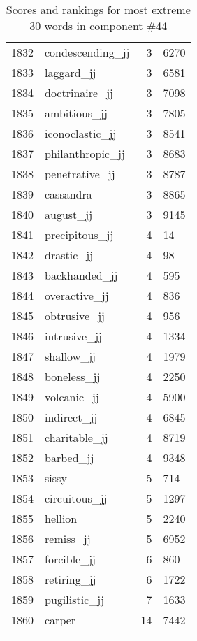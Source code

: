 \begin{longtable}[!htbp]{| rlr@{.}l |}
    1832 & condescending\_jj & 3 & 6270 \\
    1833 & laggard\_jj & 3 & 6581 \\
    1834 & doctrinaire\_jj & 3 & 7098 \\
    1835 & ambitious\_jj & 3 & 7805 \\
    1836 & iconoclastic\_jj & 3 & 8541 \\
    1837 & philanthropic\_jj & 3 & 8683 \\
    1838 & penetrative\_jj & 3 & 8787 \\
    1839 & cassandra & 3 & 8865 \\
    1840 & august\_jj & 3 & 9145 \\
    1841 & precipitous\_jj & 4 & 14 \\
    1842 & drastic\_jj & 4 & 98 \\
    1843 & backhanded\_jj & 4 & 595 \\
    1844 & overactive\_jj & 4 & 836 \\
    1845 & obtrusive\_jj & 4 & 956 \\
    1846 & intrusive\_jj & 4 & 1334 \\
    1847 & shallow\_jj & 4 & 1979 \\
    1848 & boneless\_jj & 4 & 2250 \\
    1849 & volcanic\_jj & 4 & 5900 \\
    1850 & indirect\_jj & 4 & 6845 \\
    1851 & charitable\_jj & 4 & 8719 \\
    1852 & barbed\_jj & 4 & 9348 \\
    1853 & sissy & 5 & 714 \\
    1854 & circuitous\_jj & 5 & 1297 \\
    1855 & hellion & 5 & 2240 \\
    1856 & remiss\_jj & 5 & 6952 \\
    1857 & forcible\_jj & 6 & 860 \\
    1858 & retiring\_jj & 6 & 1722 \\
    1859 & pugilistic\_jj & 7 & 1633 \\
    1860 & carper & 14 & 7442 \\
    \hline
    \caption{Scores and rankings for most extreme 30 words in component \#44} \\
\end{longtable}
